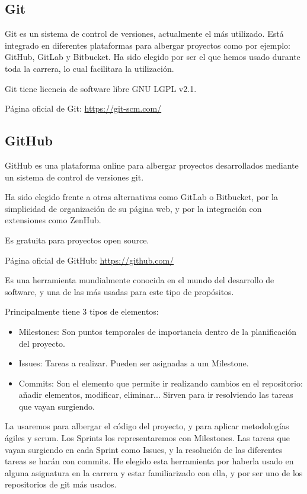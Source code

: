 \subsection{Git}
Git es un sistema de control de versiones, actualmente el más utilizado. Está integrado en diferentes plataformas para albergar proyectos como por ejemplo: GitHub, GitLab y Bitbucket.
Ha sido elegido por ser el que hemos usado durante toda la carrera, lo cual facilitara la utilización.

Git tiene licencia de software libre GNU LGPL v2.1.

Página oficial de Git: \url{https://git-scm.com/}

\subsection{GitHub}
GitHub es una plataforma online para albergar proyectos desarrollados mediante un sistema de control de versiones git. 

Ha sido elegido frente a otras alternativas como GitLab o Bitbucket, por la simplicidad de organización de su página web, y por la integración con extensiones como ZenHub.

Es gratuita para proyectos open source.

Página oficial de GitHub: \url{https://github.com/}

Es una herramienta mundialmente conocida en el mundo del desarrollo de software, y una de las más usadas para este tipo de propósitos.

Principalmente tiene 3 tipos de elementos:
\begin{itemize}
	\item Milestones: Son puntos temporales de importancia dentro de la planificación del proyecto.
	\item Issues: Tareas a realizar. Pueden ser asignadas a um Milestone. 
 	\item Commits: Son el elemento que permite ir realizando cambios en el repositorio: añadir elementos, modificar, eliminar... Sirven para ir resolviendo las tareas que vayan surgiendo.
\end{itemize}

La usaremos para albergar el código del proyecto, y para aplicar metodologías ágiles y scrum. Los Sprints los representaremos con Milestones. Las tareas que vayan surgiendo en cada Sprint como Issues, y la resolución de las diferentes tareas se harán con commits. He elegido esta herramienta por haberla usado en alguna asignatura en la carrera y estar familiarizado con ella, y por ser uno de los repositorios de git más usados.


